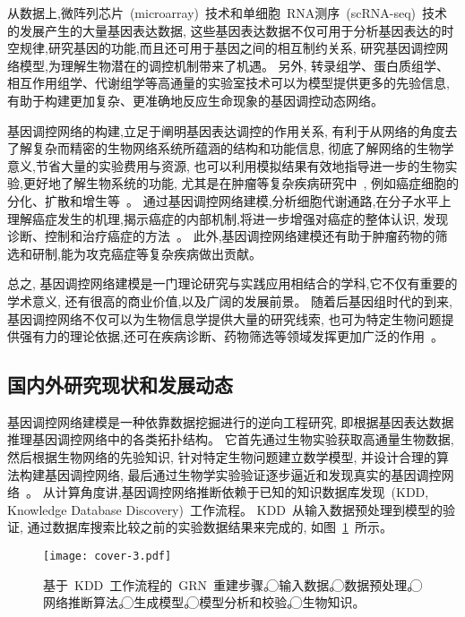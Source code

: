 从数据上,微阵列芯片~(microarray)~技术和单细胞~RNA测序~(scRNA-seq)~技术的发展产生的大量基因表达数据,
这些基因表达数据不仅可用于分析基因表达的时空规律,研究基因的功能,而且还可用于基因之间的相互制约关系,
研究基因调控网络模型,为理解生物潜在的调控机制带来了机遇。
另外, 转录组学、蛋白质组学、相互作用组学、代谢组学等高通量的实验室技术可以为模型提供更多的先验信息,
有助于构建更加复杂、更准确地反应生命现象的基因调控动态网络。


基因调控网络的构建,立足于阐明基因表达调控的作用关系,
有利于从网络的角度去了解复杂而精密的生物网络系统所蕴涵的结构和功能信息,
彻底了解网络的生物学意义,节省大量的实验费用与资源,
也可以利用模拟结果有效地指导进一步的生物实验,更好地了解生物系统的功能,
尤其是在肿瘤等复杂疾病研究中~\cite{boyle2017expanded},
例如癌症细胞的分化、扩散和增生等~\cite{hurley2011gene}。
通过基因调控网络建模,分析细胞代谢通路,在分子水平上理解癌症发生的机理,揭示癌症的内部机制,将进一步增强对癌症的整体认识,
发现诊断、控制和治疗癌症的方法~\cite{kreeger2009cancer,yan2016biological}。
此外,基因调控网络建模还有助于肿瘤药物的筛选和研制,能为攻克癌症等复杂疾病做出贡献。

总之, 基因调控网络建模是一门理论研究与实践应用相结合的学科,它不仅有重要的学术意义,
还有很高的商业价值,以及广阔的发展前景。
随着后基因组时代的到来,基因调控网络不仅可以为生物信息学提供大量的研究线索,
也可为特定生物问题提供强有力的理论依据,还可在疾病诊断、药物筛选等领域发挥更加广泛的作用~\cite{kreeger2009cancer}。

\subsection{国内外研究现状和发展动态}

基因调控网络建模是一种依靠数据挖掘进行的逆向工程研究, 即根据基因表达数据推理基因调控网络中的各类拓扑结构。
它首先通过生物实验获取高通量生物数据, 然后根据生物网络的先验知识, 针对特定生物问题建立数学模型, 
并设计合理的算法构建基因调控网络, 最后通过生物学实验验证逐步逼近和发现真实的基因调控网络~\cite{sima2009inference}。
从计算角度讲,基因调控网络推断依赖于已知的知识数据库发现~(KDD, Knowledge Database Discovery)~工作流程。
KDD~从输入数据预处理到模型的验证, 通过数据库搜索比较之前的实验数据结果来完成的, 如图~\ref{cover-3}~所示。
\begin{figure}[!htbp]
    \centering
    \texttt{[image: cover-3.pdf]}
    \caption{基于~KDD~工作流程的~GRN~重建步骤。
    \textcircled{\raisebox{-0.9pt}{1}}输入数据。
    \textcircled{\raisebox{-0.9pt}{2}}数据预处理。
    \textcircled{\raisebox{-0.9pt}{3}}网络推断算法。
    \textcircled{\raisebox{-0.9pt}{4}}生成模型。
    \textcircled{\raisebox{-0.9pt}{5}}模型分析和校验。
    \textcircled{\raisebox{-0.9pt}{6}}生物知识。
    }
    \label{cover-3}
\end{figure}

